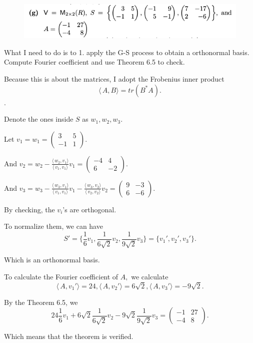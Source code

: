 \documentclass[12pt]{article}%
\begin{document}
\begin{figure}[htp]
    \centering %
    \includegraphics[width = 15cm]{img/Q6.png}
\end{figure}

What I need to do is to 1. apply the G-S process to obtain a orthonormal basis.
Compute Fourier coefficient and use Theorem 6.5 to check.

Because this is about the matrices, I adopt the Frobenius inner product $$\langle\, A , B \rangle =tr(B^{*}A).$$.

Denote the ones inside $S$ as $w_1,w_2,w_3.$

Let $v_1=w_1=\begin{pmatrix} 3&5\\-1&1\end{pmatrix}.$

And $v_2=w_2-\frac{\langle\, w_2 , v_1 \rangle}{\langle\, v_1 , v_1 \rangle}v_1=\begin{pmatrix} -4&4\\6&-2\end{pmatrix}.$

And $v_3=w_3-\frac{\langle\, w_3,v_1\rangle}{\langle\, v_1 , v_1 \rangle}v_1-\frac{\langle\, w_3,v_2\rangle}{\langle\, v_2 , v_2 \rangle}v_2=\begin{pmatrix}9&-3\\6&-6 \end{pmatrix}.$

By checking, the $v_i$'s are orthogonal.

To normalize them, we can have $$S'=\{ \frac{1}{6}v_1, \frac{1}{6\sqrt{2}}v_2, \frac{1}{9\sqrt{2}}v_3\}=\{v_1',v_2',v_3'\}.$$

Which is an orthonormal basis.

To calculate the Fourier coefficient of $A,$ we calculate $$\langle\, A , v_1' \rangle=24, \langle\, A , v_2' \rangle=6\sqrt{2}, \langle\, A , v_3' \rangle=-9\sqrt{2}.$$

By the Theorem 6.5, we $$24\frac{1}{6}v_1 + 6\sqrt{2}\frac{1}{6\sqrt{2}}v_2-9\sqrt{2}\frac{1}{9\sqrt{2}}v_3=\begin{pmatrix}-1&27\\-4&8 \end{pmatrix}.$$

Which means that the theorem is verified.
\end{document}
